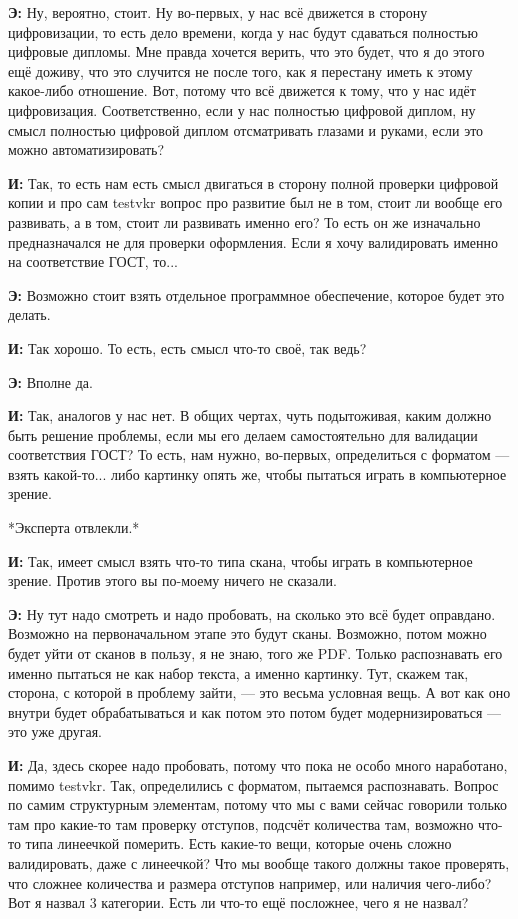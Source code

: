 \textbf{Э: }Ну, вероятно, стоит. Ну во-первых, у нас всё движется в сторону цифровизации, то есть дело времени, когда у нас будут сдаваться полностью цифровые дипломы. Мне правда хочется верить, что это будет, что я до этого ещё доживу, что это случится не после того, как я перестану иметь к этому какое-либо отношение. Вот, потому что всё движется к тому, что у нас идёт цифровизация. Соответственно, если у нас полностью цифровой диплом, ну смысл полностью цифровой диплом отсматривать глазами и руками, если это можно автоматизировать?

\textbf{И: }Так, то есть нам есть смысл двигаться в сторону полной проверки цифровой копии и про сам testvkr вопрос про развитие был не в том, стоит ли вообще его развивать, а в том, стоит ли развивать именно его? То есть он же изначально предназначался не для проверки оформления. Если я хочу валидировать именно на соответствие ГОСТ, то... 

\textbf{Э: }Возможно стоит взять отдельное программное обеспечение, которое будет это делать.

\textbf{И: }Так хорошо. То есть, есть смысл что-то своё, так ведь?

\textbf{Э: }Вполне да.

\textbf{И: }Так, аналогов у нас нет. В общих чертах, чуть подытоживая, каким должно быть решение проблемы, если мы его делаем самостоятельно для валидации соответствия ГОСТ? То есть, нам нужно, во-первых, определиться с форматом --- взять какой-то... либо картинку опять же, чтобы пытаться играть в компьютерное зрение.

*Эксперта отвлекли.*

\textbf{И: }Так, имеет смысл взять что-то типа скана, чтобы играть в компьютерное зрение. Против этого вы по-моему ничего не сказали.

\textbf{Э: }Ну тут надо смотреть и надо пробовать, на сколько это всё будет оправдано. Возможно на первоначальном этапе это будут сканы. Возможно, потом можно будет уйти от сканов в пользу, я не знаю, того же PDF. Только распознавать его именно пытаться не как набор текста, а именно картинку. Тут, скажем так, сторона, с которой в проблему зайти, --- это весьма условная вещь. А вот как оно внутри будет обрабатываться и как потом это потом будет модернизироваться --- это уже другая.

\textbf{И: }Да, здесь скорее надо пробовать, потому что пока не особо много наработано, помимо testvkr. Так, определились с форматом, пытаемся распознавать. Вопрос по самим структурным элементам, потому что мы с вами сейчас говорили только там про какие-то там проверку отступов, подсчёт количества там, возможно что-то типа линеечкой померить. Есть какие-то вещи, которые очень сложно валидировать, даже с линеечкой? Что мы вообще такого должны такое проверять, что сложнее количества и размера отступов например, или наличия чего-либо? Вот я назвал 3 категории. Есть ли что-то ещё посложнее, чего я не назвал?


